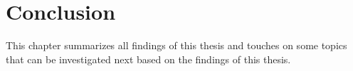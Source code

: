 \chapter{Conclusion}

This chapter summarizes all findings of this thesis and touches on some topics that can be investigated next based on the findings of this thesis.



